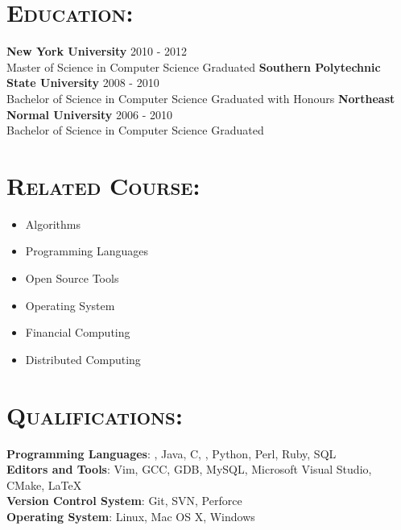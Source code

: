 \begin{resume}




\section{\textsc{Education:}}

\textbf{New York University} \hfill 2010 - 2012 \\
\hspace*{0.2in}Master of Science in Computer Science \hfill Graduated
\newline
\textbf{Southern Polytechnic State University} \hfill 2008 - 2010 \\ 
\hspace*{0.2in}Bachelor of Science in Computer Science \hfill Graduated with Honours
\newline
\textbf{Northeast Normal University} \hfill 2006 - 2010 \\
\hspace*{0.2in}Bachelor of Science in Computer Science \hfill Graduated


\section{\textsc{Related Course:}}

\begin{multicols}{2}
\begin{itemize}
    \item Algorithms
    \item Programming Languages
    \item Open Source Tools
    \item Operating System
    \item Financial Computing 
    \item Distributed Computing
\end{itemize}
\end{multicols}


\section{\textsc{Qualifications:}}

\textbf{Programming Languages}: \Cplusplus, Java, C, \CSharp, Python, Perl, Ruby, SQL \\
\textbf{Editors and Tools}: Vim, GCC, GDB, MySQL, Microsoft Visual Studio, CMake, \LaTeX \\
\textbf{Version Control System}: Git, SVN, Perforce \\
\textbf{Operating System}: Linux, Mac OS X, Windows 



\end{resume}
